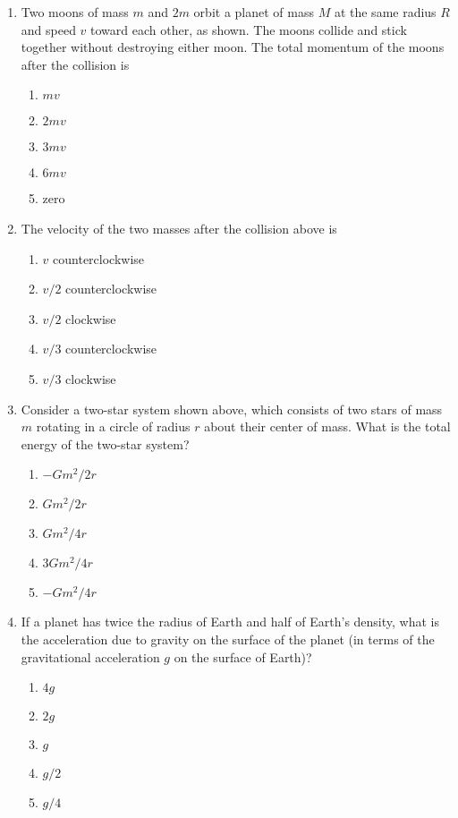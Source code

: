 \documentclass[12pt]{article}
\begin{document}
\begin{enumerate}[leftmargin=50pt,label=\underline{\hspace{0.4in}} \arabic*.]
\item\vspace{-.2in}Two moons of mass $m$ and $2m$ orbit a planet of mass $M$ at the same
  radius $R$ and speed $v$ toward each other, as shown. The moons collide
  and stick together without destroying either moon. The total momentum of
  the moons after the collision is
  \begin{enumerate}[noitemsep,topsep=0pt,leftmargin=18pt]  
  \item $mv$
  \item $2mv$
  \item $3mv$
  \item $6mv$
  \item zero
  \end{enumerate}

\item The velocity of the two masses after the collision above is
  \begin{enumerate}[noitemsep,topsep=0pt,leftmargin=18pt]  
  \item $v$ counterclockwise
  \item $v/2$ counterclockwise
  \item $v/2$ clockwise
  \item $v/3$ counterclockwise
  \item $v/3$ clockwise
  \end{enumerate}

\item Consider a two-star system shown above, which consists of two stars of
  mass $m$ rotating in a circle of radius $r$ about their center of mass. What
  is the total energy of the two-star system?
  \begin{enumerate}[noitemsep,topsep=0pt,leftmargin=18pt]  
  \item $-Gm^2/2r$
  \item $Gm^2/2r$
  \item $Gm^2/4r$
  \item $3Gm^2/4r$
  \item $-Gm^2/4r$
  \end{enumerate}

\item If a planet has twice the radius of Earth and half of Earth's density,
  what is the acceleration due to gravity on the surface of the planet (in
  terms of the gravitational acceleration $g$ on the surface of Earth)?
  \begin{enumerate}[noitemsep,topsep=0pt,leftmargin=18pt]  
  \item $4g$
  \item $2g$
  \item $g$
  \item $g/2$
  \item $g/4$
  \end{enumerate}
\end{enumerate}
\end{document}
